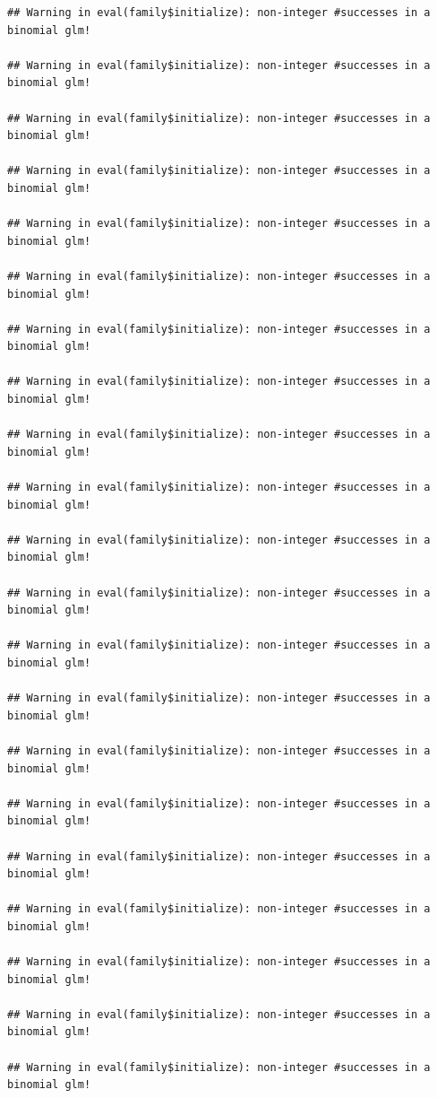 \documentclass[
]{article}
\begin{document}
\begin{verbatim}
## Warning in eval(family$initialize): non-integer #successes in a binomial glm!

## Warning in eval(family$initialize): non-integer #successes in a binomial glm!

## Warning in eval(family$initialize): non-integer #successes in a binomial glm!

## Warning in eval(family$initialize): non-integer #successes in a binomial glm!

## Warning in eval(family$initialize): non-integer #successes in a binomial glm!

## Warning in eval(family$initialize): non-integer #successes in a binomial glm!

## Warning in eval(family$initialize): non-integer #successes in a binomial glm!

## Warning in eval(family$initialize): non-integer #successes in a binomial glm!

## Warning in eval(family$initialize): non-integer #successes in a binomial glm!

## Warning in eval(family$initialize): non-integer #successes in a binomial glm!

## Warning in eval(family$initialize): non-integer #successes in a binomial glm!

## Warning in eval(family$initialize): non-integer #successes in a binomial glm!

## Warning in eval(family$initialize): non-integer #successes in a binomial glm!

## Warning in eval(family$initialize): non-integer #successes in a binomial glm!

## Warning in eval(family$initialize): non-integer #successes in a binomial glm!

## Warning in eval(family$initialize): non-integer #successes in a binomial glm!

## Warning in eval(family$initialize): non-integer #successes in a binomial glm!

## Warning in eval(family$initialize): non-integer #successes in a binomial glm!

## Warning in eval(family$initialize): non-integer #successes in a binomial glm!

## Warning in eval(family$initialize): non-integer #successes in a binomial glm!

## Warning in eval(family$initialize): non-integer #successes in a binomial glm!


\end{verbatim}
\end{document}
